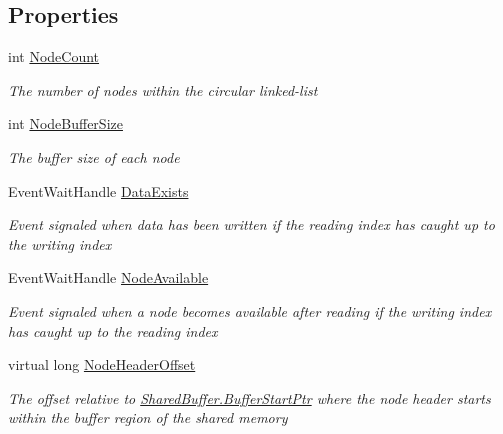 \subsection*{Properties}
\begin{DoxyCompactItemize}
\item 
int \hyperlink{class_shared_memory_1_1_circular_buffer_a24a2dbcfbebc2544beba93cd5a64ed57}{Node\+Count}
\begin{DoxyCompactList}\small\item\em The number of nodes within the circular linked-\/list \end{DoxyCompactList}\item 
int \hyperlink{class_shared_memory_1_1_circular_buffer_a25a6c6b560e818ef1ba6d645e0e14018}{Node\+Buffer\+Size}
\begin{DoxyCompactList}\small\item\em The buffer size of each node \end{DoxyCompactList}\item 
Event\+Wait\+Handle \hyperlink{class_shared_memory_1_1_circular_buffer_a5948a0e13aec25495912fb30f49466d9}{Data\+Exists}
\begin{DoxyCompactList}\small\item\em Event signaled when data has been written if the reading index has caught up to the writing index \end{DoxyCompactList}\item 
Event\+Wait\+Handle \hyperlink{class_shared_memory_1_1_circular_buffer_a6cb8d3b1110b14dcdfea740977451ace}{Node\+Available}
\begin{DoxyCompactList}\small\item\em Event signaled when a node becomes available after reading if the writing index has caught up to the reading index \end{DoxyCompactList}\item 
virtual long \hyperlink{class_shared_memory_1_1_circular_buffer_a449c60929c1fa3d491952fcaedda1c72}{Node\+Header\+Offset}
\begin{DoxyCompactList}\small\item\em The offset relative to \hyperlink{class_shared_memory_1_1_shared_buffer_a2332338ba9693ee545a34faa7c64483a}{Shared\+Buffer.\+Buffer\+Start\+Ptr} where the node header starts within the buffer region of the shared memory \end{DoxyCompactList}\item 

\end{DoxyCompactItemize}

